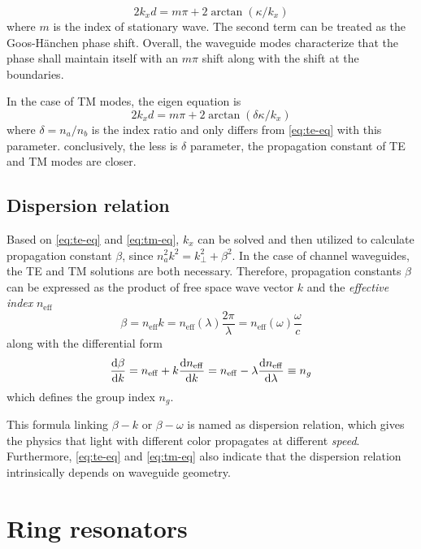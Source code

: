 \begin{equation}\label{eq:te-eq}
    2k_x d = m\pi + 2\arctan(\kappa/k_x)
\end{equation}
where $m$ is the index of stationary wave. The second term can be treated as the Goos-H\"{a}nchen phase shift. Overall, the waveguide modes characterize that the phase shall maintain itself with an $m\pi$ shift along with the shift at the boundaries.

In the case of TM modes, the eigen equation is 
\begin{equation}\label{eq:tm-eq}
    2k_x d = m\pi + 2\arctan(\delta\kappa/k_x)
\end{equation}
where $\delta=n_a/n_b$ is the index ratio and only differs from \autoref{eq:te-eq} with this parameter. conclusively, the less is $\delta$ parameter, the propagation constant of TE and TM modes are closer.

\subsection{Dispersion relation}
Based on \autoref{eq:te-eq} and \autoref{eq:tm-eq}, $k_x$ can be solved and then utilized to calculate propagation constant $\beta$, since $n_a^2k^2 = k_{\perp}^2 + \beta^2$. In the case of channel waveguides, the TE and TM solutions are both necessary. Therefore, propagation constants $\beta$ can be expressed as the product of free space wave vector $k$ and the \textit{ effective index} $n_{\mathrm{eff}}$
\begin{equation}\label{eq:disp_bk}
    \beta = n_{\mathrm{eff}}k = n_{\mathrm{eff}}(\lambda) \frac{2\pi}{\lambda} = n_{\mathrm{eff}}(\omega) \frac{\omega}{c}
\end{equation}
along with the differential form
\begin{equation}\label{eq:ng-def}
    \dv{\beta}{k} = n_{\mathrm{eff}} + k \dv{n_{\mathrm{eff}}}{k} = n_{\mathrm{eff}} - \lambda\dv{n_{\mathrm{eff}}}{\lambda} \equiv n_g
\end{equation}
which defines the group index $n_g$.

This formula linking $\beta - k$ or $\beta - \omega$ is named as dispersion relation, which gives the physics that light with different color propagates at different \textit{speed}. Furthermore, \autoref{eq:te-eq} and \autoref{eq:tm-eq} also indicate that the dispersion relation intrinsically depends on waveguide geometry.

\section{Ring resonators}

